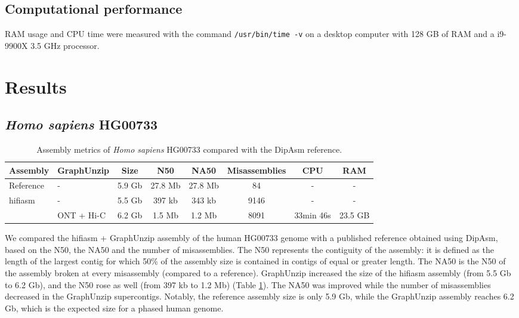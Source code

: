 \subsection{Computational performance}

RAM usage and CPU time were measured with the command \texttt{/usr/bin/time -v} on a desktop computer with 128 GB of RAM and a i9-9900X 3.5 GHz processor.

\section{Results}

\subsection{\textit{Homo sapiens} HG00733}

\begin{table}[ht]
    \begin{center}
    \caption{\label{tab:homo_sapiens_assemblies}Assembly metrics of \textit{Homo sapiens} HG00733 compared with the DipAsm reference.}
    \begin{tabular}{llcccccc}
        \hline
        \textbf{Assembly} & \textbf{GraphUnzip} & \textbf{Size} & \textbf{N50} & \textbf{NA50} & \textbf{Misassemblies} & \textbf{CPU} & \textbf{RAM} \\
        \hline
        Reference & - & 5.9 Gb & 27.8 Mb & 27.8 Mb & 84 & - & - \\
        \hline
        hifiasm & - & 5.5 Gb & 397 kb & 343 kb & 9146 & - & - \\
            & ONT + Hi-C & 6.2 Gb & 1.5 Mb & 1.2 Mb & 8091 & 33min 46s & 23.5 GB \\
        \hline
        \end{tabular}
  \end{center}
\end{table}

We compared the hifiasm + GraphUnzip assembly of the human HG00733 genome with a published reference obtained using DipAsm, based on the N50, the NA50 and the number of misassemblies. The N50 represents the contiguity of the assembly: it is defined as the length of the largest contig for which 50\% of the assembly size is contained in contigs of equal or greater length. The NA50 is the N50 of the assembly broken at every misassembly (compared to a reference). GraphUnzip increased the size of the hifiasm assembly (from 5.5 Gb to 6.2 Gb), and the N50 rose as well (from 397 kb to 1.2 Mb) (Table \ref{tab:homo_sapiens_assemblies}). The NA50 was improved while the number of misassemblies decreased in the GraphUnzip supercontigs. Notably, the reference assembly size is only 5.9 Gb, while the GraphUnzip assembly reaches 6.2 Gb, which is the expected size for a phased human genome. \\

